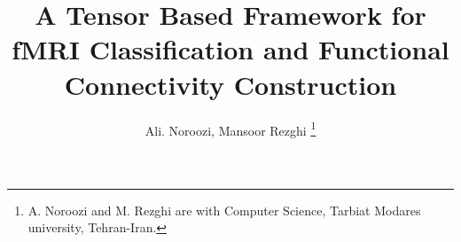 \documentclass[journal]{IEEEtran}
\begin{document}
	\title{A Tensor Based Framework for fMRI Classification and Functional Connectivity Construction} 
%	
	
	\author{Ali. Noroozi,
		Mansoor Rezghi%
		\thanks{A. Noroozi and M. Rezghi are with Computer Science, Tarbiat Modares university, Tehran-Iran.}%
	}
	
	
\end{document}
